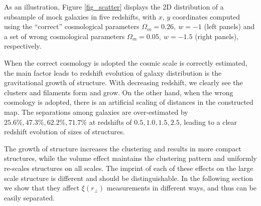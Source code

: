 \documentclass[iop]{emulateapj}
\newcommand{\hMsun}{{\ifmmode{h^{-1}{\rm
        {M_{\odot}}}}\else{$h^{-1}{\rm{M_{\odot}}}$~}\fi}}
\begin{document}
As an illustration, Figure \ref{fig_scatter} displays the 2D distribution of a subsample of mock galaxies in five redshifts,
with $x$, $y$ coordinates computed using the ``correct'' cosmological parameters $\Omega_m=0.26,\ w=-1$ (left panels) 
and a set of wrong cosmological parameters $\Omega_m=0.05,\ w=-1.5$ (right panels), respectively.

When the correct cosmology is adopted the cosmic scale is correctly estimated,
the main factor leads to redshift evolution of galaxy distribution is the gravitational growth of structure.
With decreasing redshift, we clearly see the clusters and filaments form and grow.
On the other hand, when the wrong cosmology is adopted, there is an artificial scaling of distances in the constructed map.
The separations among galaxies are over-estimated by 
$25.6\%,47.3\%,62.2\%,71.7\%$ at redshifts of $0.5,1.0,1.5,2.5$,
leading to a clear redshift evolution of sizes of structures.

The growth of structure increases the clustering and results in more compact structures,
while the volume effect maintains the clustering pattern and uniformly re-scales structures on all scales.
The imprint of each of these effects on the large scale structure is different and should be distinguishable.
In the following section we show that they affect $\xi(r_{\bot})$ measurements in different ways, 
and thus can be easily separated.





\end{document}
